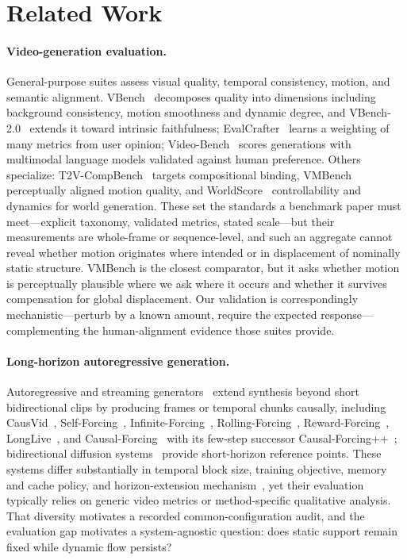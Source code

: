 \section{Related Work}
\label{sec:related}

\paragraph{Video-generation evaluation.}
General-purpose suites assess visual quality, temporal consistency, motion, and semantic alignment. VBench~\cite{huang2023vbench} decomposes quality into dimensions including background consistency, motion smoothness and dynamic degree, and VBench-2.0~\cite{Zheng2025VBench20AV} extends it toward intrinsic faithfulness; EvalCrafter~\cite{eval_crafter} learns a weighting of many metrics from user opinion; Video-Bench~\cite{han2025videobench} scores generations with multimodal language models validated against human preference. Others specialize: T2V-CompBench~\cite{sun2024t2v_compbench} targets compositional binding, VMBench~\cite{ling2025vmbench} perceptually aligned motion quality, and WorldScore~\cite{duan2025worldscore} controllability and dynamics for world generation. These set the standards a benchmark paper must meet---explicit taxonomy, validated metrics, stated scale---but their measurements are whole-frame or sequence-level, and such an aggregate cannot reveal whether motion originates where intended or in displacement of nominally static structure. VMBench is the closest comparator, but it asks whether motion is perceptually plausible where we ask where it occurs and whether it survives compensation for global displacement. Our validation is correspondingly mechanistic---perturb by a known amount, require the expected response---complementing the human-alignment evidence those suites provide.

\paragraph{Long-horizon autoregressive generation.}
Autoregressive and streaming generators~\cite{chen2024diffusion,kim2024fifo,sun2025ardiffusion,zhou2025magi,lin2025stiv} extend synthesis beyond short bidirectional clips by producing frames or temporal chunks causally, including CausVid~\cite{yin2025causvid}, Self-Forcing~\cite{huang2025selfforcing}, Infinite-Forcing~\cite{infinite-forcing}, Rolling-Forcing~\cite{liu2025rolling}, Reward-Forcing~\cite{lu2025reward}, LongLive~\cite{yang2025longlive}, and Causal-Forcing~\cite{zhu2026causal} with its few-step successor Causal-Forcing++~\cite{zhao2026causal_pp}; bidirectional diffusion systems~\cite{blattmann2023svd,yang2025cogvideox,kong2024hunyuanvideo,hacohen2024ltxvideo,wan2025} provide short-horizon reference points. These systems differ substantially in temporal block size, training objective, memory and cache policy, and horizon-extension mechanism~\cite{yesiltepe2025infinity}, yet their evaluation typically relies on generic video metrics or method-specific qualitative analysis. That diversity motivates a recorded common-configuration audit, and the evaluation gap motivates a system-agnostic question: does static support remain fixed while dynamic flow persists?

